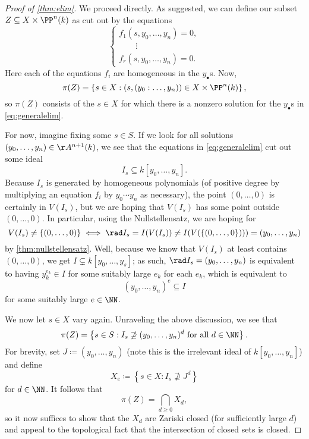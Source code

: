 \begin{proof}[Proof of \autoref{thm:elim}]
	We proceed directly. As suggested, we can define our subset $Z\subseteq X\times\PP^n(k)$ as cut out by the equations
	\[\begin{cases}
		f_1(s,y_0,\ldots,y_n)=0, \\
		\quad\quad\vdots \\
		f_r(s,y_0,\ldots,y_n)=0.
	\end{cases}\tag{3}\label{eq:generalelim}\]
	Here each of the equations $f_i$ are homogeneous in the $y_\bullet$s. Now,
	\[\pi(Z)=\left\{s\in X:(s,(y_0:\ldots,y_n))\in X\times\PP^n(k)\right\},\]
	so $\pi(Z)$ consists of the $s\in X$ for which there is a nonzero solution for the $y_\bullet$s in \autoref{eq:generalelim}.
	
	For now, imagine fixing some $s\in S$. If we look for all solutions $(y_0,\ldots,y_n)\in\AA^{n+1}(k)$, we see that the equations in \autoref{eq:generalelim} cut out some ideal
	\[I_s\subseteq k[y_0,\ldots,y_n].\]
	Because $I_s$ is generated by homogeneous polynomials (of positive degree by multiplying an equation $f_i$ by $y_0\cdots y_n$ as necessary), the point $(0,\ldots,0)$ is certainly in $V(I_s)$, but we are hoping that $V(I_s)$ has some point outside $(0,\ldots,0)$. In particular, using the Nullstellensatz, we are hoping for
	\[V(I_s)\ne\{(0,\ldots,0)\}\iff\rad I_s=I(V(I_s))\ne I(V(\{(0,\ldots,0\})))=(y_0,\ldots,y_n)\]
	by \autoref{thm:nullstellensatz}. Well, because we know that $V(I_s)$ at least contains $(0,\ldots,0)$, we get $I\subsetneq k[y_0,\ldots,y_s]$; as such, $\rad I_s=(y_0,\ldots,y_n)$ is equivalent to having $y_k^{e_k}\in I$ for some suitably large $e_k$ for each $e_k$, which is equivalent to
	\[(y_0,\ldots,y_n)^e\subseteq I\]
	for some suitably large $e\in\NN$.

	We now let $s\in X$ vary again. Unraveling the above discussion, we see that
	\[\pi(Z)=\left\{s\in S:I_s\not\supseteq(y_0,\ldots,y_n)^d\text{ for all }d\in\NN\right\}.\]
	For brevity, set $J\coloneqq(y_0,\ldots,y_n)$ (note this is the irrelevant ideal of $k[y_0,\ldots,y_n]$) and define
	\[X_e\coloneqq\left\{s\in X:I_s\not\supseteq J^d\right\}\]
	for $d\in\NN$. It follows that
	\[\pi(Z)=\bigcap_{d\ge0}X_d,\]
	so it now suffices to show that the $X_d$ are Zariski closed (for sufficiently large $d$) and appeal to the topological fact that the intersection of closed sets is closed.


\end{proof}
